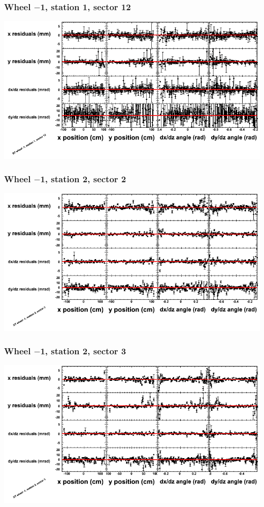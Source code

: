 \documentclass[compress]{beamer}
\begin{document}
\begin{frame}
\frametitle{Wheel $-$1, station 1, sector 12}
\includegraphics[width=\linewidth]{tmppoly_MBwhBst1sec12.png}
\end{frame}

\begin{frame}
\frametitle{Wheel $-$1, station 2, sector 2}
\includegraphics[width=\linewidth]{tmppoly_MBwhBst2sec02.png}
\end{frame}

\begin{frame}
\frametitle{Wheel $-$1, station 2, sector 3}
\includegraphics[width=\linewidth]{tmppoly_MBwhBst2sec03.png}
\end{frame}
\end{document}
